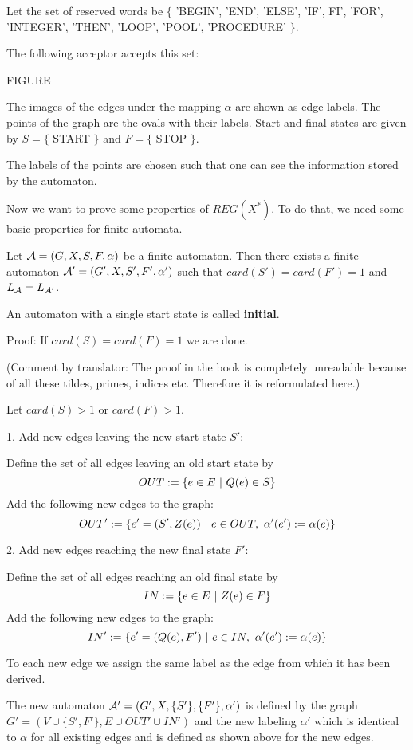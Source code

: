 Let the set of reserved words be 
$\{$ 'BEGIN', 'END', 'ELSE', 'IF', FI', 'FOR', 'INTEGER', 'THEN', 'LOOP',
'POOL', 'PROCEDURE' $\}$.

The following acceptor accepts this set:

FIGURE

The images of the edges under the mapping $\alpha$ are shown as edge labels. The
points of the graph are the ovals with their labels. Start and final states are
given by $S = \{$ START $\}$ and $F = \{$ STOP $\}$.

The labels of the points are chosen such that one can see the information stored
by the automaton.

Now we want to prove some properties of $REG(X^*)$. To do that, we need
some basic properties for finite automata.

\begin{lemma}
Let $\mbox{$\mathcal{A}$} = (G, X, S, F, \alpha)$ be a finite automaton. Then there
exists a finite automaton $\mbox{$\mathcal{A'}$} = (G', X, S', F', \alpha')$ such that
$card(S') = card(F') = 1$ and $\mbox{$L_{\mathcal{A}}$} = \mbox{$L_{\mathcal{A'}}$}$.
\end{lemma}

An automaton with a single start state is called {\bf initial}.

Proof: If $card(S) = card(F) = 1$ we are done.

(Comment by translator: The proof in the book is completely unreadable because
of all these tildes, primes, indices etc. Therefore it is reformulated here.) 

Let $card(S) > 1$ or $card(F) > 1$.

1. Add new edges leaving the new start state $S'$:

Define the set of all edges leaving an old start state by
\[ OUT := \{ e \in E \ |\  Q(e) \in S \} \]
Add the following new edges to the graph:
\[ OUT' := \{ e' = (S', Z(e)) \where e \in OUT,\ \alpha'(e') := \alpha(e) \} \]

2. Add new edges reaching the new final state $F'$:

Define the set of all edges reaching an old final state by
\[ IN := \{ e \in E \ |\  Z(e) \in F \} \]
Add the following new edges to the graph:
\[ IN' := \{ e' = (Q(e), F') \where e \in IN,\ \alpha'(e') := \alpha(e) \} \]

To each new edge we assign the same label as the edge from which it has been
derived.

The new automaton $\mbox{$\mathcal{A'}$} = (G', X, \{S'\}, \{F'\}, \alpha')$ is defined
by the graph $G' = (V \cup \{ S', F' \}, E \cup OUT' \cup IN')$
and the new labeling $\alpha'$ which is identical to $\alpha$ for all existing edges and is defined as shown above for the new edges.

